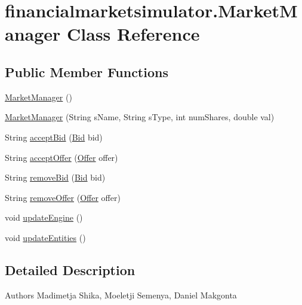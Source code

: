 \hypertarget{classfinancialmarketsimulator_1_1_market_manager}{\section{financialmarketsimulator.\+Market\+Manager Class Reference}
\label{classfinancialmarketsimulator_1_1_market_manager}
}
\subsection*{Public Member Functions}
\begin{DoxyCompactItemize}
\item 
\hyperlink{classfinancialmarketsimulator_1_1_market_manager_a59e7711f4974dd07fb5aa89f77824f86}{Market\+Manager} ()
\item 
\hyperlink{classfinancialmarketsimulator_1_1_market_manager_abec3bfc62ba95bd12c444492b7cad61e}{Market\+Manager} (String s\+Name, String s\+Type, int num\+Shares, double val)
\item 
String \hyperlink{classfinancialmarketsimulator_1_1_market_manager_a468b11be3b1e2ce72f93dfc25468273b}{accept\+Bid} (\hyperlink{classfinancialmarketsimulator_1_1_bid}{Bid} bid)
\item 
String \hyperlink{classfinancialmarketsimulator_1_1_market_manager_a2f9ad41c35ca0bb1ad2ac045f8cd3dd3}{accept\+Offer} (\hyperlink{classfinancialmarketsimulator_1_1_offer}{Offer} offer)
\item 
String \hyperlink{classfinancialmarketsimulator_1_1_market_manager_aa8c0454b1d66599ff5abbb01d35790e8}{remove\+Bid} (\hyperlink{classfinancialmarketsimulator_1_1_bid}{Bid} bid)
\item 
String \hyperlink{classfinancialmarketsimulator_1_1_market_manager_ad49a43c96b962562014c7bb37dfa5f7e}{remove\+Offer} (\hyperlink{classfinancialmarketsimulator_1_1_offer}{Offer} offer)
\item 
void \hyperlink{classfinancialmarketsimulator_1_1_market_manager_afb2bf557ed70cd23feccddfb5c01ab0d}{update\+Engine} ()
\item 
void \hyperlink{classfinancialmarketsimulator_1_1_market_manager_a32d674b201543e3a6783ec64ba172266}{update\+Entities} ()
\end{DoxyCompactItemize}


\subsection{Detailed Description}
\begin{DoxyAuthor}{Authors}
Madimetja Shika, Moeletji Semenya, Daniel Makgonta 
\end{DoxyAuthor}


